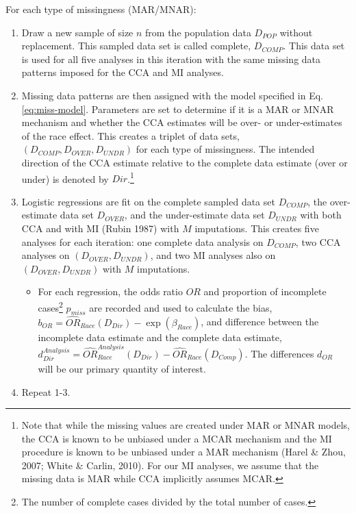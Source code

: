 \documentclass[titlepage]{article}
\begin{document}
For each type of missingness (MAR/MNAR):
\begin{enumerate}
    \item Draw a new sample of size \(n\) from the population data \(D_{POP}\) without replacement. This sampled data set is called complete, \(D_{COMP}\). This data set is used for all five analyses in this iteration with the same missing data patterns imposed for the CCA and MI analyses.
  
  \item Missing data patterns are then assigned with the model specified in Eq. \ref{eq:miss-model}. Parameters are set to determine if it is a MAR or MNAR mechanism and whether the CCA estimates will be over- or under-estimates of the race effect. This creates a triplet of data sets, \((D_{COMP}, D_{OVER}, D_{UNDR})\) for each type of missingness. The intended direction of the CCA estimate relative to the complete data estimate (over or under) is denoted by \(Dir\).\footnote{Note that while the missing values are created under MAR or MNAR models, the CCA is known to be unbiased under a MCAR mechanism and the MI procedure is known to be unbiased under a MAR mechanism (Harel \& Zhou, 2007; White \& Carlin, 2010). For our MI analyses, we assume that the missing data is MAR while CCA implicitly assumes MCAR.}
  
  \item Logistic regressions are fit on the complete sampled data set \(D_{COMP}\), the over-estimate data set \(D_{OVER}\), and the under-estimate data set \(D_{UNDR}\) with both CCA and with MI (Rubin 1987) with \(M\) imputations. This creates five analyses for each iteration: one complete data analysis on \(D_{COMP}\), two CCA analyses on \((D_{OVER}, D_{UNDR})\), and two MI analyses also on \((D_{OVER}, D_{UNDR})\) with \(M\) imputations.

  \begin{itemize}
  \item
    For each regression, the odds ratio \(OR\) and proportion of incomplete cases\footnote{The number of complete cases divided by the total number of cases.} \(p_{miss}\) are recorded and used to calculate the bias, \(b_{OR} = \hat{OR}_{Race}(D_{Dir}) - \exp(\beta_{Race})\), and difference between the incomplete data estimate and the complete data estimate, \(d_{Dir}^{Analysis} = \hat{OR}_{Race}^{Analysis}(D_{Dir}) - \hat{OR}_{Race}(D_{Comp})\). The differences \(d_{OR}\) will be our primary quantity of interest.
  \end{itemize}
  \item Repeat 1-3.
\end{enumerate}
\end{document}
